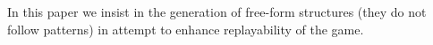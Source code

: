 \documentclass[sigconf]{acmart}
\begin{document}
%
In this paper we insist in the generation of free-form structures (they do not follow patterns) in attempt to enhance replayability of the game. 
\end{document}
